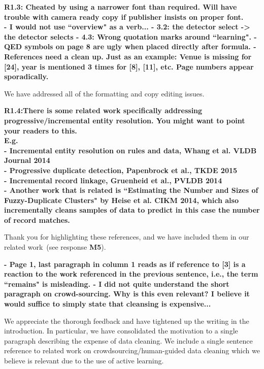 \vspace{0.5em}

\noindent\textbf{R1.3: Cheated by using a narrower font than required. Will have trouble with camera ready copy if publisher insists on proper font.\\
- I would not use ``overview" as a verb...
- 3.2: the detector select -> the detector selects
- 4.3: Wrong quotation marks around ``learning".
- QED symbols on page 8 are ugly when placed directly after formula. 
- References need a clean up. Just as an example: Venue is missing for [24], year is mentioned 3 times for [8], [11], etc. Page numbers appear sporadically.}

\noindent We have addressed all of the formatting and copy editing issues.

\vspace{0.5em}

\noindent\textbf{R1.4:There is some related work specifically addressing progressive/incremental entity resolution. You might want to point your readers to this.
\\E.g.
\\- Incremental entity resolution on rules and data, Whang et al. VLDB Journal 2014
\\- Progressive duplicate detection, Papenbrock et al., TKDE 2015
\\- Incremental record linkage, Gruenheid et al., PVLDB 2014
\\- Another work that is related is ``Estimating the Number and Sizes of Fuzzy-Duplicate Clusters" by Heise et al. CIKM 2014, which also incrementally cleans samples of data to predict in this case the number of record matches.}

Thank you for highlighting these references, and we have included them in our related work~(see response \textbf{M5}).

\vspace{0.5em}

\noindent\textbf{- Page 1, last paragraph in column 1 reads as if reference to [3] is a reaction to the work referenced in the previous sentence, i.e., the term ``remains" is misleading.
- I did not quite understand the short paragraph on crowd-sourcing. Why is this even relevant?
 I believe it would suffice to simply state that cleansing is expensive...}

We appreciate the thorough feedback and have tightened up the writing in the introduction. In particular, we have consolidated the motivation to a single paragraph describing the expense of data cleaning. We include a single sentence reference to related work on crowdsourcing/human-guided data cleaning which we believe is relevant due to the use of active learning.


